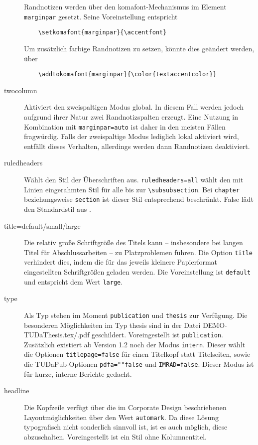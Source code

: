 \documentclass[
	german,
	accentcolor=9c,%
	]{tudapub}
\let\code\texttt
\begin{document}
\begin{description}
	Randnotizen werden über den komafont-Mechanismus \cite[vgl.][]{scrguide} im Element \code{marginpar} gesetzt. Seine Voreinstellung entspricht
	\begin{verbatim}
	\setkomafont{marginpar}{\accentfont}
	\end{verbatim}
	Um zusätzlich farbige Randnotizen zu setzen, könnte dies geändert werden, über
	\begin{verbatim}
	\addtokomafont{marginpar}{\color{textaccentcolor}}
	\end{verbatim}
	\item[twocolumn] Aktiviert den zweispaltigen Modus global. In diesem Fall werden jedoch aufgrund ihrer Natur zwei Randnotizspalten erzeugt. Eine Nutzung in Kombination mit \code{marginpar=auto} ist daher in den meisten Fällen fragwürdig. Falls der zweispaltige Modus lediglich lokal aktiviert wird, entfällt dieses Verhalten, allerdings werden dann Randnotizen deaktiviert.
	\item[ruledheaders] Wählt den Stil der Überschriften aus. \code{ruledheaders=all} wählt den mit Linien eingerahmten Stil für alle bis zur \verb+\subsubsection+. Bei \code{chapter} beziehungsweise \code{section} ist dieser Stil entsprechend beschränkt. False lädt den Standardstil aus \KOMAScript.
	\item[title=default/small/large] Die relativ große Schriftgröße des Titels kann – insbesondere bei langen Titel für Abschlussarbeiten – zu Platzproblemen führen. Die Option \code{title} verhindert dies, indem die für das jeweils kleinere Papierformat eingestellten Schriftgrößen geladen werden. Die Voreinstellung ist \code{default} und entspricht dem Wert \code{large}.
  \item[type] Als Typ stehen im Moment \code{publication} und \code{thesis} zur Verfügung. Die besonderen Möglichkeiten im Typ thesis sind in der Datei DEMO-TUDaThesis.tex/.pdf geschildert. Voreingestellt ist \code{publication}.
	Zusätzlich existiert ab Version 1.2 noch der Modus \code{intern}. Dieser wählt die Optionen \code{titlepage=false} für einen Titelkopf statt Titelseiten, sowie die TUDaPub-Optionen \code{pdfa=""false} und \code{IMRAD=false}. Dieser Modus ist für kurze, interne Berichte gedacht.
	\item[headline] Die Kopfzeile verfügt über die im Corporate Design beschriebenen Layoutmöglichkeiten über den Wert \code{automark}. Da diese Lösung typografisch nicht sonderlich sinnvoll ist, ist es auch möglich, diese abzuschalten. Voreingestellt ist ein Stil ohne Kolumnentitel.

\end{description}
\end{document}
